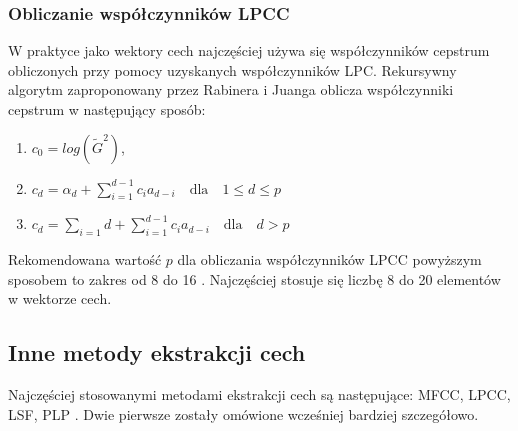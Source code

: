 \subsubsection{Obliczanie współczynników LPCC}
W praktyce \cite{fosr} jako wektory cech najczęściej używa się współczynników cepstrum obliczonych przy pomocy uzyskanych współczynników LPC. Rekursywny algorytm zaproponowany przez Rabinera i Juanga \cite{rabinerjuangfosr60} oblicza współczynniki cepstrum w następujący sposób:
\begin{enumerate}
    \centering
  \item $c_0 = log(\tilde{G}^2)$,
  \item $c_d = \alpha_d + \sum_{i=1}^{d-1} c_i a_{d-i} \quad \textrm{dla} \quad 1\leq d \leq p$
  \item $c_d = \sum_{i=1}d + \sum_{i=1}^{d-1} c_i a_{d-i} \quad \textrm{dla} \quad d > p$
\end{enumerate}

Rekomendowana wartość $p$ dla obliczania współczynników LPCC powyższym sposobem to zakres od 8 do 16 \cite{fosr}. Najczęściej stosuje się liczbę 8 do 20 elementów w wektorze cech. 
\subsection{Inne metody ekstrakcji cech}
Najczęściej stosowanymi metodami ekstrakcji cech są następujące: MFCC, LPCC, LSF, PLP \cite{overview}. Dwie pierwsze zostały omówione wcześniej bardziej szczegółowo. 
